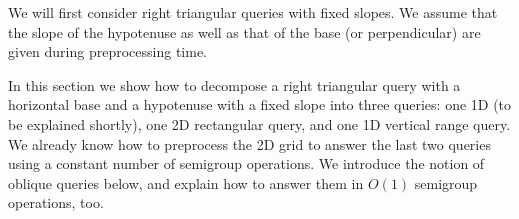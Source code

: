 We will first consider right triangular queries with fixed slopes.
We assume that the slope of the hypotenuse as well as that of the 
base (or perpendicular) are given during preprocessing time. 


In this section we show how to decompose a right triangular query with a
horizontal base and a hypotenuse with a fixed slope into three queries:
one 1D  (to be explained shortly), one 2D rectangular
query, and one 1D vertical range query.  We already know how to preprocess
the 2D grid to answer the last two queries using a constant number of
semigroup operations. We introduce the notion of oblique queries below,
and explain how to answer them in $O(1)$ semigroup operations, too.

